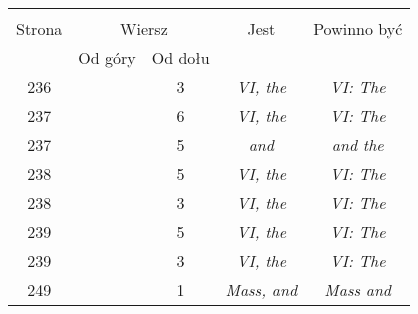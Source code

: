 \documentclass[a4paper,11pt]{article}
\begin{document}
\begin{center}
  \begin{tabular}{|c|c|c|c|c|}
    \hline
    & \multicolumn{2}{c|}{} & & \\
    Strona & \multicolumn{2}{c|}{Wiersz} & Jest
                              & Powinno być \\ \cline{2-3}
    & Od góry & Od dołu & & \\
    \hline
    236 & &  3 & \textit{VI, the} & \textit{VI: The} \\
    237 & &  6 & \textit{VI, the} & \textit{VI: The} \\
    237 & &  5 & \textit{and} & \textit{and the} \\
    238 & &  5 & \textit{VI, the} & \textit{VI: The} \\
    238 & &  3 & \textit{VI, the} & \textit{VI: The} \\
    239 & &  5 & \textit{VI, the} & \textit{VI: The} \\
    239 & &  3 & \textit{VI, the} & \textit{VI: The} \\
    249 & &  1 & \textit{Mass, and} & \textit{Mass and} \\
    \hline
  \end{tabular}






\end{center}
\end{document}
